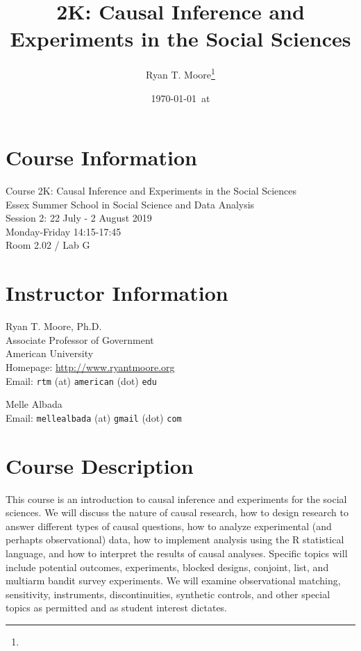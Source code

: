 \documentclass[11pt]{article}
\title{2K: Causal Inference and Experiments in the Social Sciences}
\author{Ryan T. Moore\footnote{\rtmaddr}}
\date{\today~at \xxivtime}
\begin{document}
\maketitle

\section*{Course Information}
Course 2K: Causal Inference and Experiments in the Social Sciences\\
Essex Summer School in Social Science and Data Analysis\\
Session 2: 22 July - 2 August 2019\\
Monday-Friday 14:15-17:45\\
Room 2.02 / Lab G\\

\section*{Instructor Information}
Ryan T. Moore, Ph.D. \\
Associate Professor of Government\\
American University\\
Homepage: \url{http://www.ryantmoore.org} \\
Email: {\tt rtm} (at) {\tt american} (dot) {\tt edu} \\

\vspace{.1in}

\noindent Melle Albada\\
Email: {\tt mellealbada} (at) {\tt gmail} (dot) {\tt com} \\


\section*{Course Description}

This course is an introduction to causal inference and experiments for the social sciences.  We will discuss the nature of causal research, how to design research to answer different types of causal questions, how to analyze experimental (and perhapts observational) data, how to implement analysis using the R statistical language, and how to interpret the results of causal analyses.  Specific topics will include potential outcomes, experiments, blocked designs, conjoint, list, and multiarm bandit survey experiments.  We will examine observational matching, sensitivity, instruments, discontinuities, synthetic controls, and other special topics as permitted and as student interest dictates.
\end{document}
